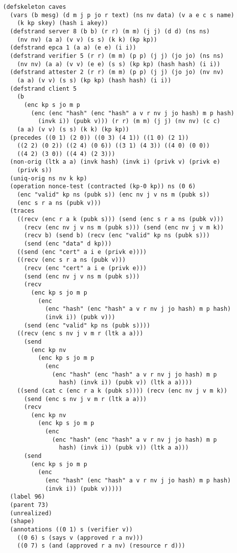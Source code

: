 \documentclass[titlepage,12pt]{article}
\theoremstyle{definition}
\begin{document}
\begin{verbatim}
(defskeleton caves
  (vars (b mesg) (d m j p jo r text) (ns nv data) (v a e c s name)
    (k kp skey) (hash i akey))
  (defstrand server 8 (b b) (r r) (m m) (j j) (d d) (ns ns)
    (nv nv) (a a) (v v) (s s) (k k) (kp kp))
  (defstrand epca 1 (a a) (e e) (i i))
  (defstrand verifier 5 (r r) (m m) (p p) (j j) (jo jo) (ns ns)
    (nv nv) (a a) (v v) (e e) (s s) (kp kp) (hash hash) (i i))
  (defstrand attester 2 (r r) (m m) (p p) (j j) (jo jo) (nv nv)
    (a a) (v v) (s s) (kp kp) (hash hash) (i i))
  (defstrand client 5
    (b
      (enc kp s jo m p
        (enc (enc "hash" (enc "hash" a v r nv j jo hash) m p hash)
          (invk i)) (pubk v))) (r r) (m m) (j j) (nv nv) (c c)
    (a a) (v v) (s s) (k k) (kp kp))
  (precedes ((0 1) (2 0)) ((0 3) (4 1)) ((1 0) (2 1))
    ((2 2) (0 2)) ((2 4) (0 6)) ((3 1) (4 3)) ((4 0) (0 0))
    ((4 2) (3 0)) ((4 4) (2 3)))
  (non-orig (ltk a a) (invk hash) (invk i) (privk v) (privk e)
    (privk s))
  (uniq-orig ns nv k kp)
  (operation nonce-test (contracted (kp-0 kp)) ns (0 6)
    (enc "valid" kp ns (pubk s)) (enc nv j v ns m (pubk s))
    (enc s r a ns (pubk v)))
  (traces
    ((recv (enc r a k (pubk s))) (send (enc s r a ns (pubk v)))
      (recv (enc nv j v ns m (pubk s))) (send (enc nv j v m k))
      (recv b) (send b) (recv (enc "valid" kp ns (pubk s)))
      (send (enc "data" d kp)))
    ((send (enc "cert" a i e (privk e))))
    ((recv (enc s r a ns (pubk v)))
      (recv (enc "cert" a i e (privk e)))
      (send (enc nv j v ns m (pubk s)))
      (recv
        (enc kp s jo m p
          (enc
            (enc "hash" (enc "hash" a v r nv j jo hash) m p hash)
            (invk i)) (pubk v)))
      (send (enc "valid" kp ns (pubk s))))
    ((recv (enc s nv j v m r (ltk a a)))
      (send
        (enc kp nv
          (enc kp s jo m p
            (enc
              (enc "hash" (enc "hash" a v r nv j jo hash) m p
                hash) (invk i)) (pubk v)) (ltk a a))))
    ((send (cat c (enc r a k (pubk s)))) (recv (enc nv j v m k))
      (send (enc s nv j v m r (ltk a a)))
      (recv
        (enc kp nv
          (enc kp s jo m p
            (enc
              (enc "hash" (enc "hash" a v r nv j jo hash) m p
                hash) (invk i)) (pubk v)) (ltk a a)))
      (send
        (enc kp s jo m p
          (enc
            (enc "hash" (enc "hash" a v r nv j jo hash) m p hash)
            (invk i)) (pubk v)))))
  (label 96)
  (parent 73)
  (unrealized)
  (shape)
  (annotations ((0 1) s (verifier v))
    ((0 6) s (says v (approved r a nv)))
    ((0 7) s (and (approved r a nv) (resource r d)))

\end{verbatim}
\end{document}
